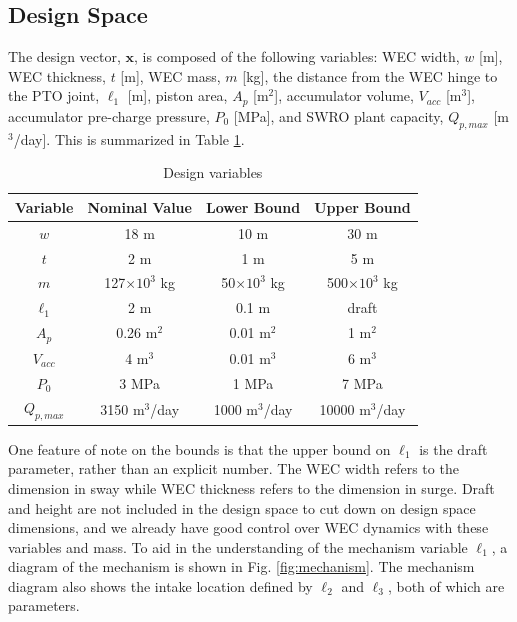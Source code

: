 \documentclass[twocolumn,10pt]{asme2e}
\begin{document}
\subsection{Design Space}
The design vector, $\mathbf{x}$, is composed of the following variables: WEC width, $w$ [m], WEC thickness, $t$ [m], WEC mass, $m$ [kg], the distance from the WEC hinge to the PTO joint, $\ell_1$ [m], piston area, $A_p$ [m$^2$], accumulator volume, $V_{acc}$ [m$^3$], accumulator pre-charge pressure, $P_0$ [MPa], and SWRO plant capacity, $Q_{p,max}$ [m$^3$/day]. This is summarized in Table \ref{tab:design_space}.
\begin{table}[h]
    \centering
    \caption{Design variables}
    \begin{tabular}{|c|c|c|c|}
        \hline
        Variable & Nominal Value & Lower Bound & Upper Bound\\
        \hline
        $w$ & 18 m & 10 m & 30 m \\
        $t$ & 2 m & 1 m & 5 m \\
        $m$ & 127$\times10^3$ kg & 50$\times10^3$ kg & 500$\times10^3$ kg \\
        $\ell_1$ & 2 m & 0.1 m & draft \\
        $A_p$ & 0.26 m$^2$ & 0.01 m$^2$ & 1 m$^2$ \\
        $V_{acc}$ & 4 m$^3$ & 0.01 m$^3$ & 6 m$^3$ \\
        $P_0$ & 3 MPa & 1 MPa & 7 MPa \\
        $Q_{p,max}$ & 3150 m$^3$/day & 1000 m$^3$/day & 10000 m$^3$/day\\
        \hline
    \end{tabular}
    \label{tab:design_space} 
\end{table}
One feature of note on the bounds is that the upper bound on $\ell_1$ is the draft parameter, rather than an explicit number. The WEC width refers to the dimension in sway while WEC thickness refers to the dimension in surge. Draft and height are not included in the design space to cut down on design space dimensions, and we already have good control over WEC dynamics with these variables and mass. To aid in the understanding of the mechanism variable $\ell_1$, a diagram of the mechanism is shown in Fig. \ref{fig:mechanism}. The mechanism diagram also shows the intake location defined by $\ell_2$ and $\ell_3$, both of which are parameters.
\end{document}
